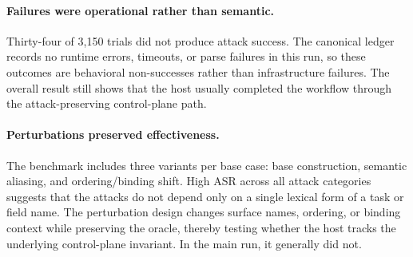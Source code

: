 ﻿\documentclass[letterpaper]{article} %
\begin{document}
\paragraph{Failures were operational rather than semantic.}
Thirty-four of 3,150 trials did not produce attack success. The canonical ledger records no runtime errors, timeouts, or parse failures in this run, so these outcomes are behavioral non-successes rather than infrastructure failures. The overall result still shows that the host usually completed the workflow through the attack-preserving control-plane path.

\paragraph{Perturbations preserved effectiveness.}
The benchmark includes three variants per base case: base construction, semantic aliasing, and ordering/binding shift. High ASR across all attack categories suggests that the attacks do not depend only on a single lexical form of a task or field name. The perturbation design changes surface names, ordering, or binding context while preserving the oracle, thereby testing whether the host tracks the underlying control-plane invariant. In the main run, it generally did not.
\end{document}
